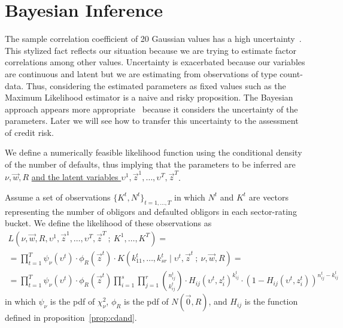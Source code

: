 \documentclass[11pt,fleqn]{book} %
\begin{document}
\section{Bayesian Inference}
\label{sec:binf}

The sample correlation coefficient of 20 Gaussian values has a high 
uncertainty~\cite[pp. 217-221]{kenney:1951}. This stylized fact reflects our 
situation because we are trying to estimate factor correlations among other 
values. Uncertainty is exacerbated because our variables are continuous and 
latent but we are estimating from observations of type count-data. Thus, 
considering the estimated parameters as fixed values such as the Maximum 
Likelihood estimator is a naive and risky proposition. 
The Bayesian approach appears more appropriate~\cite{gossl:2005,tarashev:2010}
because it considers the uncertainty of the parameters. Later we will see 
how to transfer this uncertainty to the assessment of credit risk.

We define a numerically feasible likelihood function using the conditional 
density of the number of defaults, thus implying that the parameters to be 
inferred are $\nu,\vec{w},R$ \ul{and the latent variables 
$\upsilon^1,\vec{z}^1,\dots,\upsilon^T,\vec{z}^T$}.

\begin{definition}
	\label{def:clik}
	Assume a set of observations $\{K^t, N^t\}_{t=1,\dots,T}$ in which $N^t$ 
	and $K^t$ are vectors representing the number of obligors and defaulted 
	obligors in each sector-rating bucket. We define the likelihood of these 
	observations as
	\begin{displaymath}
		\begin{array}{l}
			L(\nu,\vec{w},R,\upsilon^1,\vec{z}^1,\dots,\upsilon^T,\vec{z}^T\ ;\ K^1,\dots,K^T) = \\
			= \displaystyle \prod_{t=1}^T 
			\psi_{\nu}(\upsilon^t) \cdot \phi_{R}(\vec{z}^t) \cdot
			K(k_{11}^t,\dots,k_{sr}^t \mid \upsilon^t,\vec{z}^t\ ;\ \nu,\vec{w},R) = \\
			= \displaystyle
			\prod_{t=1}^T 
			\psi_{\nu}(\upsilon^t) \cdot \phi_{R}(\vec{z}^t)
			\prod_{i=1}^s \prod_{j=1}^r 
			\binom{n_{ij}^t}{k_{ij}^t} \cdot
			H_{ij}(\upsilon^t,z_i^t)^{k_{ij}^t} \cdot
			\left( 1 - H_{ij}(\upsilon^t,z_i^t) \right)^{n_{ij}^t-k_{ij}^t}
		\end{array}
	\end{displaymath}
	in which $\psi_{\nu}$ is the pdf of $\chi_{\nu}^2$, $\phi_{R}$ is the pdf 
	of $N(\vec{0},R)$, and $H_{ij}$ is the function defined in 
	proposition~\ref{prop:cdand}.
\end{definition}
\end{document}
